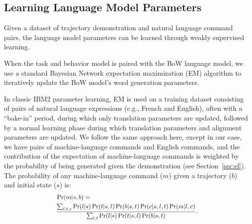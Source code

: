 \documentclass[conference]{IEEEtran}
\newcommand*{\Scale}[2][4]{\scalebox{#1}{$#2$}}%
\begin{document}
\subsection{Learning Language Model Parameters}
\label{sec:learnLang}
Given a dataset of trajectory demonstration and natural language command pairs, the language model parameters can be learned through weakly supervised learning. 

When the task and behavior model is paired with the BoW language model, we use a standard Bayesian Network expectation maximization (EM) algorithm \cite{dempster77} to iteratively update the BoW model's word generation parameters. 

In classic IBM2 parameter learning, EM is used on a training dataset consisting of pairs of natural language expressions (e.g., French and English), often with a ``bake-in'' period, during which only translation parameters are updated, followed by a normal learning phase during which translation parameters and alignment parameters are updated. We follow the same approach here, except in our case, we have pairs of machine-language commands and English commands, and the contribution of the expectation of machine-language commands is weighted by the probability of being generated given the demonstration (see Section~\ref{sec:el}). The probability of any machine-language command ($m$) given a trajectory ($b$) and initial state ($s$) is:
\begin{equation}
\vspace{1em}
\Scale[0.9]{
\begin{split}
& \Pr(m | s, b) = \\ & \frac{\sum_{l,t,c} \Pr(l | s) \Pr(t | s, l) \Pr(b | s, t) \Pr(c | s, l, t) \Pr(m | l, c)}{\sum_{l,t} \Pr(l | s) \Pr(t | s, l) \Pr(b | s, t)}.
\end{split}
}
\end{equation}
\end{document}
